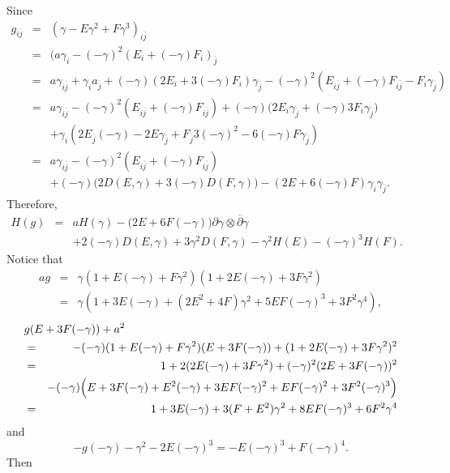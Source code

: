 \documentclass[12pt]{amsart}
\def\d{\partial}
\def\jbar{\overline{j}}
\def\dbar{\overline{\partial}}
\def\d{\partial}
\begin{document}
Since
\begin{eqnarray}
g_{i\jbar}&=&(\gamma- E \gamma^2+F \gamma^3) _{i\jbar} \nonumber\\
&=& (a \gamma_i -(-\gamma)^2 (E_i+(-\gamma) F_i)_{\jbar} \nonumber\\
&=&  a\gamma_{i\jbar}
 +\gamma_i a_{\jbar} +(-\gamma) (2 E_i +3(-\gamma) F_i) \gamma_{\jbar}
-(-\gamma)^2 (E_{i\jbar} +(-\gamma) F_{i\bar j} -F_i \gamma_{\jbar} ) \nonumber\\
&=& a \gamma_{i\jbar} -(-\gamma)^2 (E_{i\jbar}+(-\gamma) F_{i\jbar}) +(-\gamma) \Big(2 E_i \gamma_{\jbar}+(-\gamma) 3F_i \gamma_{\jbar}\Big)\nonumber\\
&&+ \gamma_i ( 2E_{\jbar} (-\gamma) -2E\gamma_{\jbar}+F_{\jbar} 3(-\gamma)^2 -6(-\gamma) F \gamma_{\jbar})\nonumber\\
&=& a \gamma_{i\jbar} -(-\gamma)^2( E_{i\jbar}+(-\gamma) F_{i\jbar})\nonumber\\
&& +(-\gamma) \Big(2D(E, \gamma)+3(-\gamma) D(F, \gamma)\Big)
-(2E +6(-\gamma)F) \gamma_i \gamma_{\jbar}.\nonumber
\end{eqnarray}
Therefore,
\begin{eqnarray}\label{For1}
H(g)&=&a H(\gamma)-\Big( 2E+6F(-\gamma)\Big)  \d \gamma \otimes \dbar \gamma\nonumber
\\
&&
+2 (-\gamma) D(E, \gamma)+3 \gamma^2 D(F, \gamma)
-  \gamma^2 H(E) -(-\gamma)^3 H(F).\quad
\end{eqnarray}
Notice that
\begin{eqnarray*}
a g&=&\gamma (1+E(-\gamma)+F\gamma^2) (1+2E(-\gamma)+3F\gamma^2)\\
&=&\gamma(1+3 E(-\gamma)+(2E^2+4F)\gamma^2+5EF (-\gamma)^3+3F^2 \gamma^4),
\end{eqnarray*}
\begin{eqnarray*}
\lefteqn{g (E+3F(-\gamma))+a^2}\\
&=&-(-\gamma) (1+E (-\gamma)+F\gamma^2)(E+3F(-\gamma))+(1+2E(-\gamma)+3F\gamma^2)^2\\
&=&1+2(2E(-\gamma)+3F\gamma^2)+(-\gamma)^2(2E+3F(-\gamma))^2\\
&&-(-\gamma)\Big(E+3F(-\gamma) +E^2(-\gamma) +3E F(-\gamma)^2+EF (-\gamma)^2+3F^2(-\gamma)^3\Big)\\
&=&1+3E(-\gamma)+3(F+E^2) \gamma^2 +8EF (-\gamma)^3+6F^2\gamma^4
\end{eqnarray*}
and
$$
-g (-\gamma)-\gamma^2-2E (-\gamma)^3= -E (-\gamma)^3+F(-\gamma)^4.
$$
Then
\end{document}

